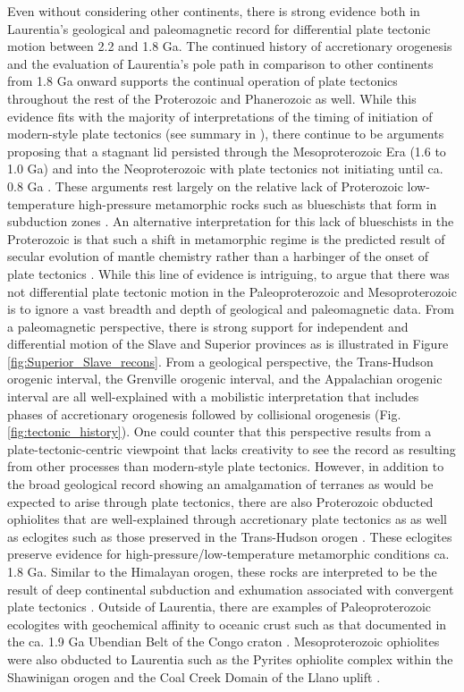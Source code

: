 \documentclass[twocolumn, switch]{article} %
\begin{document}
Even without considering other continents, there is strong evidence both in Laurentia's geological and paleomagnetic record for differential plate tectonic motion between 2.2 and 1.8 Ga. The continued history of accretionary orogenesis and the evaluation of Laurentia's pole path in comparison to other continents from 1.8 Ga onward supports the continual operation of plate tectonics throughout the rest of the Proterozoic and Phanerozoic as well. While this evidence fits with the majority of interpretations of the timing of initiation of modern-style plate tectonics (see summary in \citealp{Korenaga2013a}), there continue to be arguments proposing that a stagnant lid persisted through the Mesoproterozoic Era (1.6 to 1.0 Ga) and into the Neoproterozoic  with plate tectonics not initiating until ca. 0.8 Ga \citep{Hamilton2011a, Stern2018a}. These arguments rest largely on the relative lack of Proterozoic low-temperature high-pressure metamorphic rocks such as blueschists that form in subduction zones \citep{Stern2013a}. An alternative interpretation for this lack of blueschists in the Proterozoic is that such a shift in metamorphic regime is the predicted result of secular evolution of mantle chemistry rather than a harbinger of the onset of plate tectonics \citep{Palin2015a}. While this line of evidence is intriguing, to argue that there was not differential plate tectonic motion in the Paleoproterozoic and Mesoproterozoic is to ignore a vast breadth and depth of geological and paleomagnetic data. From a paleomagnetic perspective, there is strong support for independent and differential motion of the Slave and Superior provinces as is illustrated in Figure \ref{fig:Superior_Slave_recons}. From a geological perspective, the Trans-Hudson orogenic interval, the Grenville orogenic interval, and the Appalachian orogenic interval are all well-explained with a mobilistic interpretation that includes phases of accretionary orogenesis followed by collisional orogenesis (Fig. \ref{fig:tectonic_history}). One could counter that this perspective results from a plate-tectonic-centric viewpoint that lacks creativity to see the record as resulting from other processes than modern-style plate tectonics. However, in addition to the broad geological record showing an amalgamation of terranes as would be expected to arise through plate tectonics, there are also Proterozoic obducted ophiolites that are well-explained through accretionary plate tectonics as as well as eclogites such as those preserved in the Trans-Hudson orogen \citep{Weller2017a}. These eclogites preserve evidence for high-pressure/low-temperature metamorphic conditions ca. 1.8 Ga. Similar to the Himalayan orogen, these rocks are interpreted to be the result of deep continental subduction and exhumation associated with convergent plate tectonics \citep{Weller2017a}. Outside of Laurentia, there are examples of Paleoproterozoic ecologites with geochemical affinity to oceanic crust such as that documented in the ca. 1.9 Ga Ubendian Belt of the Congo craton \citep{Boniface2012a}. Mesoproterozoic ophiolites were also obducted to Laurentia such as the Pyrites ophiolite complex within the Shawinigan orogen and the Coal Creek Domain of the Llano uplift \citep{Chiarenzelli2011a, McLelland2013a}.
\end{document}
